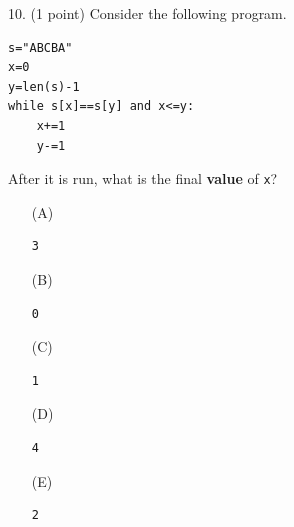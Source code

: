 \documentclass{article}
\begin{document}
\noindent
\begin{minipage}{\textwidth}
10. (1 point)
Consider the following program.
\begin{verbatim}
s="ABCBA"
x=0
y=len(s)-1
while s[x]==s[y] and x<=y:
    x+=1
    y-=1
\end{verbatim}
After it is run, what is the final \textbf{value} of \texttt{x}?

\begin{enumerate}
\item[(A)]
\begin{verbatim}3\end{verbatim}

\item[(B)]
\begin{verbatim}0\end{verbatim}

\item[(C)]
\begin{verbatim}1\end{verbatim}

\item[(D)]
\begin{verbatim}4\end{verbatim}

\item[(E)]
\begin{verbatim}2\end{verbatim}

\end{enumerate}
\end{minipage}
\vspace{2em}
\filbreak\vfil{}\vfilneg
\end{document}
